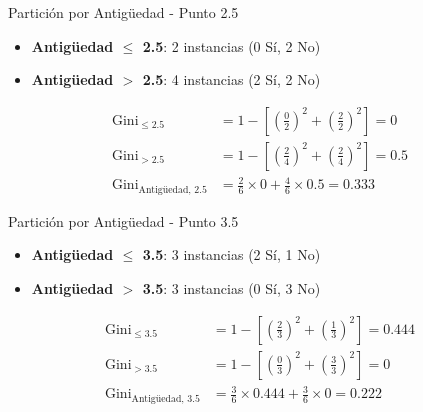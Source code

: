 \documentclass{beamer}
\begin{document}
\begin{frame}{Partición por Antigüedad - Punto 2.5}
    \begin{itemize}
        \item \textbf{Antigüedad $\leq$ 2.5}: 2 instancias (0 Sí, 2 No)
        \item \textbf{Antigüedad $>$ 2.5}: 4 instancias (2 Sí, 2 No)
    \end{itemize}
    
    \vspace{0.5em}
    
    \begin{align*}
        \mathrm{Gini}_{\leq 2.5} &= 1 - \left[\left(\tfrac{0}{2}\right)^2 + \left(\tfrac{2}{2}\right)^2\right] = 0 \\
        \mathrm{Gini}_{> 2.5} &= 1 - \left[\left(\tfrac{2}{4}\right)^2 + \left(\tfrac{2}{4}\right)^2\right] = 0.5 \\
        \mathrm{Gini}_{\text{Antigüedad, 2.5}} &= \tfrac{2}{6}\times0 + \tfrac{4}{6}\times0.5 = 0.333
    \end{align*}
\end{frame}

\begin{frame}{Partición por Antigüedad - Punto 3.5}
    \begin{itemize}
        \item \textbf{Antigüedad $\leq$ 3.5}: 3 instancias (2 Sí, 1 No)
        \item \textbf{Antigüedad $>$ 3.5}: 3 instancias (0 Sí, 3 No)
    \end{itemize}
    
    \vspace{0.5em}
    
    \begin{align*}
        \mathrm{Gini}_{\leq 3.5} &= 1 - \left[\left(\tfrac{2}{3}\right)^2 + \left(\tfrac{1}{3}\right)^2\right] = 0.444 \\
        \mathrm{Gini}_{> 3.5} &= 1 - \left[\left(\tfrac{0}{3}\right)^2 + \left(\tfrac{3}{3}\right)^2\right] = 0 \\
        \mathrm{Gini}_{\text{Antigüedad, 3.5}} &= \tfrac{3}{6}\times0.444 + \tfrac{3}{6}\times0 = 0.222
    \end{align*}
\end{frame}
\end{document}
